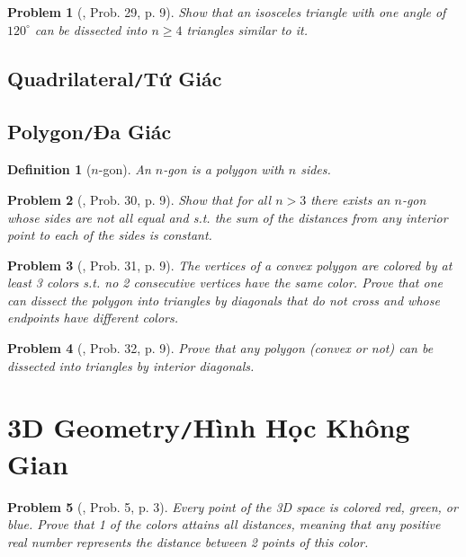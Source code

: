\documentclass[oneside]{book}
\numberwithin{equation}{section}
\newtheorem{definition}{Definition}[section]
\newtheorem{problem}{Problem}[section]
\begin{document}
\begin{problem}[\cite{Gelca_Andreescu2017}, Prob. 29, p. 9]
	Show that an isosceles triangle with one angle of $120^\circ$ can be dissected into $n\ge 4$ triangles similar to it.
\end{problem}

\subsection{Quadrilateral\texttt{/}Tứ Giác}

\subsection{Polygon\texttt{/}Đa Giác}

\begin{definition}[$n$-gon]
	An \emph{$n$-gon} is a polygon with $n$ sides.
\end{definition}

\begin{problem}[\cite{Gelca_Andreescu2017}, Prob. 30, p. 9]
	Show that for all $n > 3$ there exists an $n$-gon whose sides are not all equal and s.t. the sum of the distances from any interior point to each of the sides is constant.
\end{problem}

\begin{problem}[\cite{Gelca_Andreescu2017}, Prob. 31, p. 9]
	The vertices of a convex polygon are colored by at least 3 colors s.t. no 2 consecutive vertices have the same color. Prove that one can dissect the polygon into triangles by diagonals that do not cross and whose endpoints have different colors.
\end{problem}

\begin{problem}[\cite{Gelca_Andreescu2017}, Prob. 32, p. 9]
	Prove that any polygon (convex or not) can be dissected into triangles by interior diagonals.
\end{problem}

\section{3D Geometry\texttt{/}Hình Học Không Gian}

\begin{problem}[\cite{Gelca_Andreescu2017}, Prob. 5, p. 3]
	Every point of the 3D space is colored red, green, or blue. Prove that 1 of the colors attains all distances, meaning that any positive real number represents the distance between 2 points of this color.
\end{problem}
\end{document}
